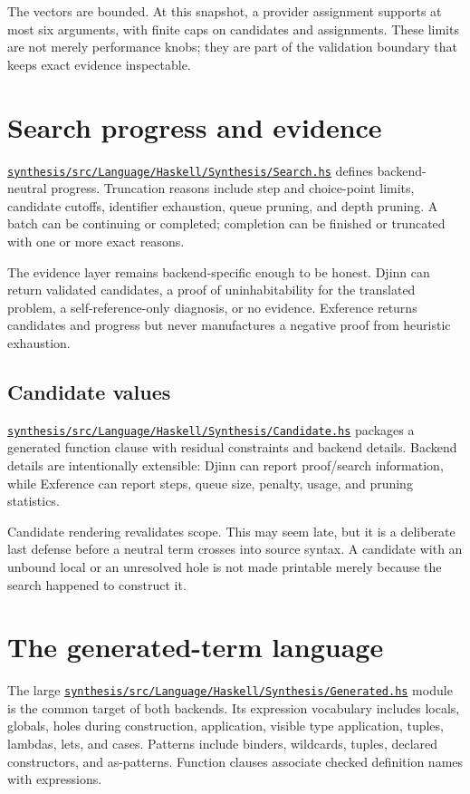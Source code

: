 \documentclass[10pt,letterpaper,oneside]{report}
\def\DjexBase{https://github.com/VladimirReshetnikov/Djex/blob/e454757d53ec057238c22fc6cd0d935b7d96b3dc/}
\newcommand{\dpath}[1]{\href{\DjexBase#1}{\nolinkurl{#1}}}
\begin{document}
The vectors are bounded. At this snapshot, a provider assignment supports at most six arguments, with finite caps on candidates and assignments. These limits are not merely performance knobs; they are part of the validation boundary that keeps exact evidence inspectable.

\section{Search progress and evidence}

\dpath{synthesis/src/Language/Haskell/Synthesis/Search.hs} defines backend-neutral progress. Truncation reasons include step and choice-point limits, candidate cutoffs, identifier exhaustion, queue pruning, and depth pruning. A batch can be continuing or completed; completion can be finished or truncated with one or more exact reasons.

The evidence layer remains backend-specific enough to be honest. Djinn can return validated candidates, a proof of uninhabitability for the translated problem, a self-reference-only diagnosis, or no evidence. Exference returns candidates and progress but never manufactures a negative proof from heuristic exhaustion.

\subsection{Candidate values}

\dpath{synthesis/src/Language/Haskell/Synthesis/Candidate.hs} packages a generated function clause with residual constraints and backend details. Backend details are intentionally extensible: Djinn can report proof/search information, while Exference can report steps, queue size, penalty, usage, and pruning statistics.

Candidate rendering revalidates scope. This may seem late, but it is a deliberate last defense before a neutral term crosses into source syntax. A candidate with an unbound local or an unresolved hole is not made printable merely because the search happened to construct it.

\section{The generated-term language}\label{sec:generated-ast}

The large \dpath{synthesis/src/Language/Haskell/Synthesis/Generated.hs} module is the common target of both backends. Its expression vocabulary includes locals, globals, holes during construction, application, visible type application, tuples, lambdas, lets, and cases. Patterns include binders, wildcards, tuples, declared constructors, and as-patterns. Function clauses associate checked definition names with expressions.
\end{document}
